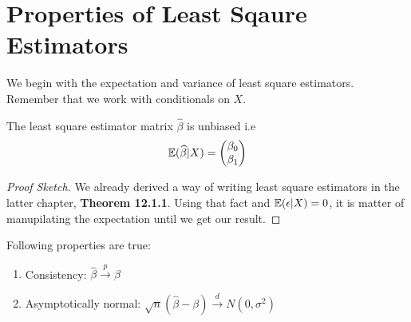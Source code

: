 \section{Properties of  Least Sqaure Estimators}
We begin with the expectation and variance of least square estimators. Remember that we work with conditionals on $X$.
\begin{theorem}
    The least square estimator matrix $\widehat{\beta}$ is unbiased i.e
    \[{\mathbb{E}}(\widehat{\beta} | X) = 
    \begin{pmatrix}
        \beta_0\\
        \beta_1
    \end{pmatrix}\]
    \begin{proof}[Proof Sketch]
        We already derived a way of writing least square estimators in the latter chapter, \textbf{Theorem 12.1.1}. Using that fact and ${\mathbb{E}}(\epsilon | X) = 0$, it is matter of manupilating the expectation until we get our result.
    \end{proof}
\end{theorem}
\begin{theorem}
    Following properties are true:
    \begin{enumerate}
        \item Consistency: $\widehat{\beta} \stackrel{p}{\longrightarrow} \beta$
        \item Asymptotically normal: $\sqrt{n}(\widehat{\beta} - \beta) \stackrel{d}{\longrightarrow} N(0, \sigma^2)$
    \end{enumerate}
\end{theorem}
